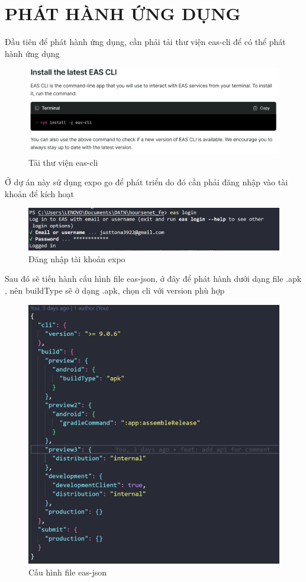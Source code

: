 \section{PHÁT HÀNH ỨNG DỤNG}
Đầu tiên để phát hành ứng dụng, cần phải tải thư viện eas-cli để có thể phát hành ứng dụng 
\begin{figure}[H]
    \centering
    \includegraphics[width=1\textwidth]{Images/Build_app/eas_install.png}
    \caption{Tải thư viện eas-cli}
\end{figure}
Ở dự án này sử dụng expo go để phát triển do đó cần phải đăng nhập vào tài khoản để kích hoạt
\begin{figure}[H]
    \centering
    \includegraphics[width=1\textwidth]{Images/Build_app/build_login.png}
    \caption{Đăng nhập tài khoản expo}
\end{figure}
Sau đó sẽ tiến hành cấu hình file eas-json, ở đây để phát hành dưới dạng file .apk , nên buildType sẽ ở dạng .apk, chọn cli với version phù hợp
\begin{figure}[H]
    \centering
    \includegraphics[width=1\textwidth]{Images/Build_app/eas-json.png}
    \caption{Cấu hình file eas-json}
\end{figure}
